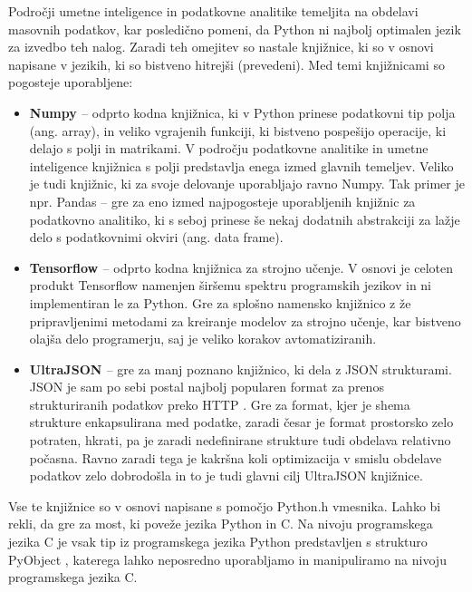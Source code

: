 \documentclass[a4paper,12pt,openright]{book}
\begin{document}
    Področji umetne inteligence in podatkovne analitike temeljita na obdelavi masovnih podatkov, kar posledično pomeni, da Python ni najbolj optimalen jezik za izvedbo teh nalog. Zaradi teh omejitev so nastale knjižnice, ki so v osnovi napisane v jezikih, ki so bistveno hitrejši (prevedeni). Med temi knjižnicami so pogosteje uporabljene:
    \begin{itemize}
        \item \textbf{Numpy \cite{NUMPY_GITHUB}} – odprto kodna knjižnica, ki v Python prinese podatkovni tip polja (ang. array), in veliko vgrajenih funkciji, ki bistveno pospešijo operacije, ki delajo s polji in matrikami. V področju podatkovne analitike in umetne inteligence knjižnica s polji predstavlja enega izmed glavnih temeljev. Veliko je tudi knjižnic, ki za svoje delovanje uporabljajo ravno Numpy. Tak primer je npr. Pandas \cite{PANDAS_GITHUB} – gre za eno izmed najpogosteje uporabljenih knjižnic za podatkovno analitiko, ki s seboj prinese še nekaj dodatnih abstrakciji za lažje delo s podatkovnimi okviri (ang. data frame).
        \item \textbf{Tensorflow \cite{TENSORFLOW_GITHUB}} –  odprto kodna knjižnica za strojno učenje. V osnovi je celoten produkt Tensorflow namenjen širšemu spektru programskih jezikov in ni implementiran le za Python. Gre za splošno namensko knjižnico z že pripravljenimi metodami za kreiranje modelov za strojno učenje, kar bistveno olajša delo programerju, saj je veliko korakov avtomatiziranih.
        \item \textbf{UltraJSON \cite{UJSON_GITHUB}} – gre za manj poznano knjižnico, ki dela z JSON strukturami. JSON je sam po sebi postal najbolj popularen format za prenos strukturiranih podatkov preko HTTP \cite{JSON_ACM}. Gre za format, kjer je shema strukture enkapsulirana med podatke, zaradi česar je format prostorsko zelo potraten, hkrati, pa je zaradi nedefinirane strukture tudi obdelava relativno počasna. Ravno zaradi tega je kakršna koli optimizacija v smislu obdelave podatkov zelo dobrodošla in to je tudi glavni cilj UltraJSON knjižnice.
    \end{itemize}

    \noindent
    Vse te knjižnice so v osnovi napisane s pomočjo Python.h vmesnika. Lahko bi rekli, da gre za most, ki poveže jezika Python in C. Na nivoju programskega jezika C je vsak tip iz programskega jezika Python predstavljen s strukturo PyObject \cite{PY_OBJECT}, katerega lahko neposredno uporabljamo in manipuliramo na nivoju programskega jezika C. 
\end{document}
